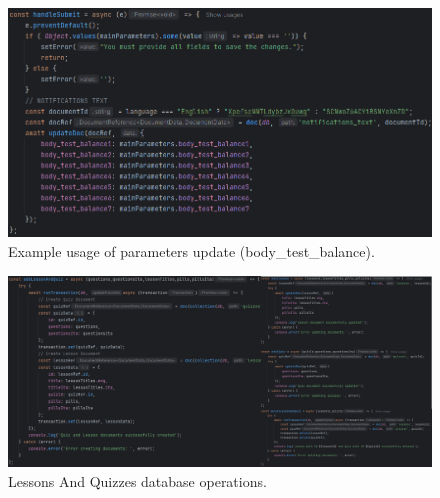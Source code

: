 \begin{figure}
    \centering
    \includegraphics[width=1.0\linewidth]{./images/bodyTestBalanceParameters.png}
    \caption{Example usage of parameters update (body\_test\_balance).}
\end{figure}

\begin{figure}
    \centering
    \includegraphics[width=1.0\linewidth]{./images/lessonsQuizzesParameters.jpg}
    \caption{Lessons And Quizzes database operations.}
\end{figure}
